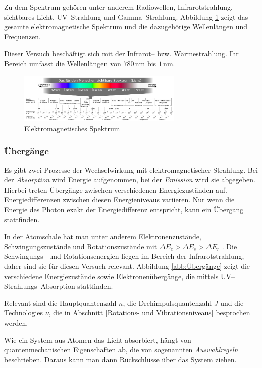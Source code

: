 \documentclass[12pt,a4paper]{scrartcl}
\numberwithin{equation}{section} %
\begin{document}
Zu dem Spektrum gehören unter anderem Radiowellen, Infrarotstrahlung, sichtbares Licht, UV--Strahlung und Gamma--Strahlung. Abbildung \ref{abb:EM Spektrum} zeigt das gesamte elektromagnetische Spektrum und die dazugehörige Wellenlängen und Frequenzen.

Dieser Versuch beschäftigt sich mit der Infrarot-- bzw. Wärmestrahlung. Ihr Bereich umfasst die Wellenlängen von $780\mathrm{\,nm}$ bis $1\mathrm{\,nm}$.

\begin{figure}[h!]
  \centering
  \includegraphics[width=0.7\textwidth]{../media/B1.1/EM_Spektrum.png}
  \caption{Elektromagnetisches Spektrum \cite{Wikipedia: Elektromagnetisches Spektrum}}
  \label{abb:EM Spektrum}
\end{figure}

\subsubsection{Übergänge}
\label{Übergänge}
Es gibt zwei Prozesse der Wechselwirkung mit elektromagnetischer Strahlung. Bei der \emph{Absorption} wird Energie aufgenommen, bei der \emph{Emission} wird sie abgegeben. Hierbei treten Übergänge zwischen verschiedenen Energiezuständen auf. Energiedifferenzen zwischen diesen Energieniveaus variieren. Nur wenn die Energie des Photon exakt der Energiedifferenz entspricht, kann ein Übergang stattfinden.

In der Atomschale hat man unter anderem Elektronenzustände, Schwingungszustände und Rotationszustände mit $\Delta E_{e} > \Delta E_{s} > \Delta E_{r}$ \cite{Agilent Technologies}. Die Schwingungs-- und Rotationsenergien liegen im Bereich der Infrarotstrahlung, daher sind sie für diesen Versuch relevant. Abbildung \ref{abb:Übergänge} zeigt die verschiedene Energiezustände sowie Elektronenübergänge, die mittels UV--Strahlungs--Absorption stattfinden.

Relevant sind die Hauptquantenzahl $n$, die Drehimpulsquantenzahl $J$ und die Technologies $\nu$, die in Abschnitt \ref{Rotations- und Vibrationsniveaus} besprochen werden.

Wie ein System aus Atomen das Licht absorbiert, hängt von quantenmechanischen Eigenschaften ab, die von sogenannten \emph{Auswahlregeln} beschrieben. Daraus kann man dann Rückschlüsse über das System ziehen.
\end{document}
